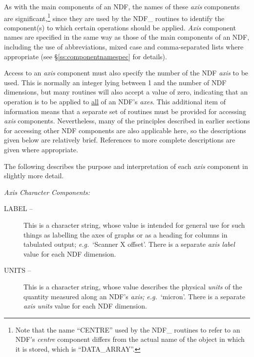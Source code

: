 \documentclass[twoside,11pt,nolof]{starlink}
\providecommand{\st}[1]{{\emph{#1}}}
\begin{document}
As with the main components of an NDF, the names of these \st{axis\/}
components are significant,\footnote{Note that the name ``CENTRE'' used by
the NDF\_ routines to refer to an NDF's \st{centre\/} component differs
from the actual name of the  object in which it is stored, which is
``DATA\_ARRAY''.} since they are used by the NDF\_ routines to identify the
component(s) to which certain operations should be applied.
\st{Axis\/} component names are specified in the same way as those of the
main components of an NDF, including the use of abbreviations, mixed case
and comma-separated lists where appropriate (see
\S\ref{ss:componentnamespec} for details).

Access to an \st{axis\/} component must also specify the number of the NDF
\st{axis} to be used.
This is normally an integer lying between 1 and the number of NDF
dimensions, but many routines will also accept a value of zero, indicating
that an operation is to be applied to \underline{all} of an NDF's \st{axes}.
This additional item of information means that a separate set of routines
must be provided for accessing \st{axis\/} components.
Nevertheless, many of the principles described in earlier sections for
accessing other NDF components are also applicable here, so the descriptions
given below are relatively brief.
References to more complete descriptions are given where appropriate.

The following describes the purpose and interpretation of each \st{axis\/}
component in slightly more detail.

{\large \st{Axis Character Components:}}\nopagebreak
\begin{description}

\item[LABEL --] This is a character string, whose value is intended for
general use for such things as labelling the axes of graphs or as a heading
for columns in tabulated output; \st{e.g.}\ `Scanner X offset'.
There is a separate \st{axis label\/} value for each NDF dimension.

\item[UNITS --] This is a character string, whose value describes the
physical \st{units\/} of the quantity measured along an NDF's \st{axis;\/}
\st{e.g.}\ `micron'.
There is a separate \st{axis units\/} value for each NDF dimension.

\end{description}
\end{document}
